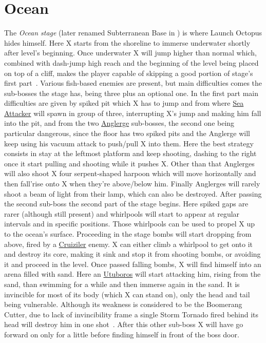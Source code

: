  
 
\section{Ocean}
The \textit{Ocean stage} (later renamed Subterranean Base in \mhx) is where Launch Octopus hides himself. Here X starts from the shoreline to immerse underwater shortly after level's beginning. Once underwater X will jump higher than normal which, combined with dash-jump high reach and the beginning of the level being placed on top of a cliff, makes the player capable of skipping a good portion of stage's first part~\cite{stratwiki:Ocean}. Various fish-based enemies are present, but main difficulties comes the sub-bosses the stage has, being three plus an optional one. In the first part main difficulties are given by spiked pit which X has to jump and from where \hyperlink{enem:Sea_Attacker}{Sea Attacker} will spawn in group of three, interrupting X's jump and making him fall into the pit, and from the two \hyperlink{miniboss:Anglerge}{Anglerge} sub-bosses, the second one being particular dangerous, since the floor has two spiked pits and the Anglerge will keep using his vacuum attack to push/pull X into them. Here the best strategy consists in stay at the leftmost platform and keep shooting, dashing to the right once it start pulling and shooting while it pushes X. Other than that Anglerges will also shoot X four serpent-shaped harpoon which will move horizontally and then fall'rise onto X when they're above/below him. Finally Anglerges will rarely shoot a beam of light from their lamp, which can also be destroyed. After passing the second sub-boss the second part of the stage begins. Here spiked gaps are rarer (although still present) and whirlpools will start to appear at regular intervals and in specific positions. Those whirlpools can be used to propel X up to the ocean's surface. Proceeding in the stage bombs will start dropping from above, fired by a \hyperlink{miniboss:Cruiziler}{Cruiziler} enemy. X can either climb a whirlpool to get onto it and destroy its core, making it sink and stop it from shooting bombs, or avoiding it and proceed in the level. Once passed falling bombs, X will find himself into an arena filled with sand. Here an \hyperlink{miniboss:Utuboros}{Utuboros} will start attacking him, rising from the sand, than swimming for a while and then immerse again in the sand. It is invincible for most of its body (which X can stand on), only the head and tail being vulnerable. Although its weakness is considered to be the Boomerang Cutter, due to lack of invincibility frame a single Storm Tornado fired behind its head will destroy him in one shot~\cite{wiki:Utuboros}. After this other sub-boss X will have go forward on only for a little before finding himself in front of the boss door.

